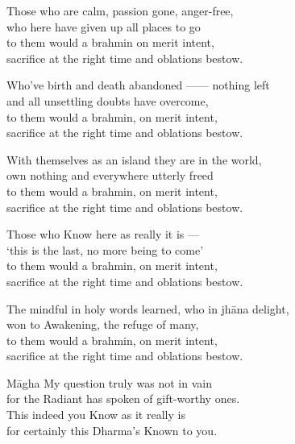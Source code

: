 \begin{MyDescription}{}
Those who are calm, passion gone, anger-free,\\
who here have given up all places to go\\
to them would a brahmin on merit intent,\\
sacrifice at the right time and oblations bestow.
\end{MyDescription}

\begin{MyDescription}{}
Who've birth and death abandoned —— nothing left\\
and all unsettling doubts have overcome,\\
to them would a brahmin, on merit intent,\\
sacrifice at the right time and oblations bestow.
\end{MyDescription}

\begin{MyDescription}{}
With themselves as an island they are in the world,\\
own nothing and everywhere utterly freed\\
to them would a brahmin, on merit intent,\\
sacrifice at the right time and oblations bestow.
\end{MyDescription}

\begin{MyDescription}{}
Those who Know here as really it is —\\
`this is the last, no more being to come'\\
to them would a brahmin, on merit intent,\\
sacrifice at the right time and oblations bestow.
\end{MyDescription}

\begin{MyDescription}{}
The mindful in holy words learned, who in jh\=ana delight,\\
won to Awakening, the refuge of many,\\
to them would a brahmin, on merit intent,\\
sacrifice at the right time and oblations bestow.
\end{MyDescription}

\begin{MyDescription}{M\=agha}
My question truly was not in vain\\
for the Radiant has spoken of gift-worthy ones.\\
This indeed you Know as it really is\\
for certainly this Dharma's Known to you.
\end{MyDescription}

